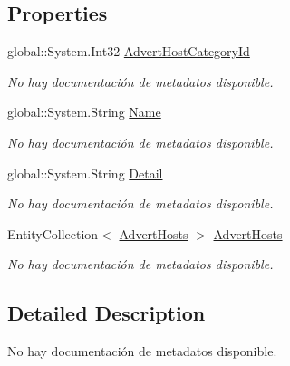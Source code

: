 \subsection*{Properties}
\begin{DoxyCompactItemize}
\item 
global\-::\-System.\-Int32 \hyperlink{class_game_memory_1_1_advert_host_categories_a8e29b02e2d791d91f54adba5fbbbb015}{Advert\-Host\-Category\-Id}
\begin{DoxyCompactList}\small\item\em No hay documentación de metadatos disponible. \end{DoxyCompactList}\item 
global\-::\-System.\-String \hyperlink{class_game_memory_1_1_advert_host_categories_a27c87fd89b900401aa077659f344f87f}{Name}
\begin{DoxyCompactList}\small\item\em No hay documentación de metadatos disponible. \end{DoxyCompactList}\item 
global\-::\-System.\-String \hyperlink{class_game_memory_1_1_advert_host_categories_a192d719edeeeb2188e5f05b036b56de6}{Detail}
\begin{DoxyCompactList}\small\item\em No hay documentación de metadatos disponible. \end{DoxyCompactList}\item 
Entity\-Collection$<$ \hyperlink{class_game_memory_1_1_advert_hosts}{Advert\-Hosts} $>$ \hyperlink{class_game_memory_1_1_advert_host_categories_a3d8f8d6f01ed2c43921957b1de473fe8}{Advert\-Hosts}
\begin{DoxyCompactList}\small\item\em No hay documentación de metadatos disponible. \end{DoxyCompactList}\end{DoxyCompactItemize}


\subsection{Detailed Description}
No hay documentación de metadatos disponible. 



